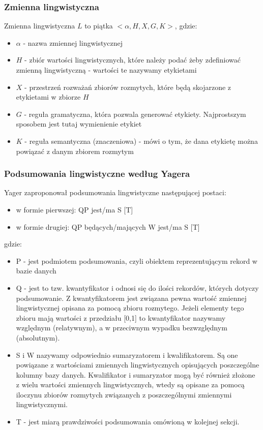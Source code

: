 \documentclass{classrep}
\begin{document}
\subsubsection{Zmienna lingwistyczna}
Zmienna lingwistyczna $L$ to piątka $<\alpha, H, X, G, K>$, gdzie:
\begin{itemize}
\item $\alpha$ - nazwa zmiennej lingwistycznej
\item $H$ - zbiór wartości lingwistycznych, które należy podać żeby zdefiniować zmienną lingwistyczną - wartości te nazywamy etykietami
\item $X$ - przestrzeń rozważań zbiorów rozmytych, które będą skojarzone z etykietami w zbiorze $H$
\item $G$ - reguła gramatyczna, która pozwala generować etykiety. Najprostszym sposobem jest tutaj wymienienie etykiet
\item $K$ - reguła semantyczna (znaczeniowa) - mówi o tym, że dana etykietę można powiązać z danym zbiorem rozmytym
\end{itemize}

\subsubsection{Podsumowania lingwistyczne według Yagera}
Yager zaproponował podsumowania lingwistyczne następującej postaci:
\begin{itemize}
\item w formie pierwszej: QP jest/ma S [T]
\item w formie drugiej: QP będących/mających W jest/ma S [T]
\end{itemize}
gdzie:
\begin{itemize}
\item P - jest podmiotem podsumowania, czyli obiektem reprezentującym rekord w bazie danych
\item Q - jest to tzw. kwantyfikator i odnosi się do ilości rekordów, których dotyczy podsumowanie. Z kwantyfikatorem jest związana pewna wartość zmiennej lingwistycznej opisana za pomocą zbioru rozmytego. Jeżeli elementy tego zbioru mają wartości z przedziału [0,1] to kwantyfikator nazywamy względnym (relatywnym), a w przeciwnym wypadku bezwzględnym (absolutnym).
\item S i W nazywamy odpowiednio sumaryzatorem i kwalifikatorem. Są one powiązane z wartościami zmiennych lingwistycznych opisujących poszczególne kolumny bazy danych. Kwalifikator i sumaryzator mogą być również złożone z wielu wartości zmiennych lingwistycznych, wtedy są opisane za pomocą iloczynu zbiorów rozmytych związanych z poszczególnymi zmiennymi lingwistycznymi.
\item T - jest miarą prawdziwości podsumowania omówioną w kolejnej sekcji.
\end{itemize}
\end{document}
